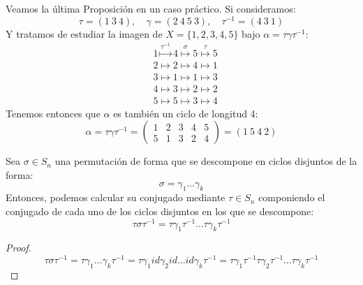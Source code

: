 \begin{ejemplo}
    Veamos la última Proposición en un caso práctico. Si consideramos:
    \begin{equation*}
        \tau = (1\ 3\ 4), \quad \gamma = (2\ 4\ 5\ 3), \quad \tau^{-1} = (4\ 3\ 1)
    \end{equation*}
    Y tratamos de estudiar la imagen de $X=\{1,2,3,4,5\}$ bajo $\alpha=\tau\gamma\tau^{-1}$:
    \begin{align*}
        &1 \stackrel{\tau^{-1}}{\longmapsto} 4 \stackrel{\sigma}{\longmapsto} 5 \stackrel{\tau}{\longmapsto} 5 \\
        &2 \longmapsto2 \longmapsto 4 \longmapsto 1 \\
        &3 \longmapsto1 \longmapsto1 \longmapsto 3 \\
        &4 \longmapsto 3 \longmapsto 2 \longmapsto 2 \\
        &5\longmapsto 5 \longmapsto 3 \longmapsto 4
    \end{align*} 
    Tenemos entonces que $\alpha$ es también un ciclo de longitud 4:
    \begin{equation*}
        \alpha=\tau\gamma\tau^{-1} = \left(\begin{array}{ccccc}
            1 & 2 & 3 & 4 & 5 \\
            5 & 1 & 3 & 2 & 4 
        \end{array}\right) = (1\ 5\ 4\ 2)
    \end{equation*}
\end{ejemplo}

\begin{prop}\label{prop:conjugar_permutaciones}
    Sea $\sigma\in S_n$ una permutación de forma que se descompone en ciclos disjuntos de la forma:
    \begin{equation*}
        \sigma = \gamma_1\ldots\gamma_k
    \end{equation*}
    Entonces, podemos calcular su conjugado mediante $\tau\in S_n$ componiendo el conjugado de cada uno de los ciclos disjuntos en los que se descompone:
    \begin{equation*}
        \tau\sigma\tau^{-1} = \tau\gamma_1\tau^{-1}\ldots \tau\gamma_k\tau^{-1}
    \end{equation*}
    \begin{proof}
        \begin{equation*}
            \tau\sigma\tau^{-1} = \tau\gamma_1\ldots\gamma_k\tau^{-1} = \tau \gamma_1 id \gamma_2 id \ldots id \gamma_k \tau^{-1} = \tau\gamma_1\tau^{-1}\tau \gamma_2 \tau^{-1} \ldots \tau\gamma_k\tau^{-1}
        \end{equation*}
    \end{proof}
\end{prop}


